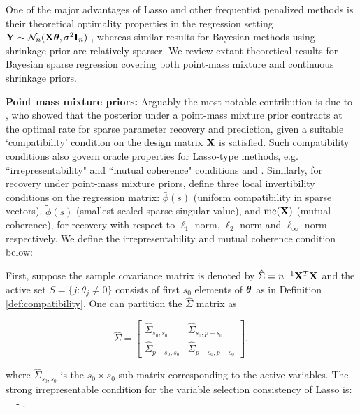 \documentclass[sts,preprint]{imsart}
\begin{document}
One of the major advantages of Lasso and other frequentist penalized methods is their theoretical optimality properties in the regression setting ${\bf Y} \sim {\cal N}_n({\bf X} \boldsymbol{\theta}, \sigma^2 {\bf I}_n)$ \citep[e.g.]{buhlmann2011statistics}, whereas similar results for Bayesian methods using shrinkage prior are relatively sparser. We review extant theoretical results for Bayesian sparse regression covering both point-mass mixture and continuous shrinkage priors. 

\vspace{0.1in}
\noindent \textbf{Point mass mixture priors:} Arguably the most notable contribution is due to \citet{castillo2015bayesian}, who showed that the posterior under a point-mass mixture prior contracts at the optimal rate for sparse parameter recovery and prediction, 
given a suitable `compatibility' condition on the design matrix ${\bf X}$ is satisfied. Such compatibility conditions also govern oracle properties for Lasso-type methods, e.g. ``irrepresentability" and ``mutual coherence" conditions \citep[\textit{vide} Ch. 6]{buhlmann2011statistics} and \citep{zhao2006model}. Similarly, for recovery under point-mass mixture priors, \citet{castillo2015bayesian} define three local invertibility conditions on the regression matrix: $\bar{\phi}(s)$ (uniform compatibility in sparse vectors), $\tilde{\phi}(s)$ (smallest scaled sparse singular value), and $\text{mc}({\bf X})$ (mutual coherence), for recovery with respect to $\ell_1$ norm, $\ell_2$ norm and $\ell_{\infty}$ norm respectively. We define the irrepresentability and mutual coherence condition below:

First, suppose the sample covariance matrix is denoted by $\hat{\Sigma} = n^{-1} {\bf X}^T {\bf X}$ and the active set $S = \{ j : \theta_j \ne 0 \}$ consists of first $s_0$ elements of $\boldsymbol{\theta}$ as in Definition \ref{def:compatibility}. One can partition the $\hat{\Sigma}$ matrix as 

\[
\hat{\Sigma} = \begin{bmatrix} 
	\hat{\Sigma}_{s_0, s_0} & \hat{\Sigma}_{s_0, p - s_0} \\
  \hat{\Sigma}_{p-s_0, s_0} & \hat{\Sigma}_{p-s_0, p - s_0}   
								\end{bmatrix},
\]

where $\hat{\Sigma}_{s_0, s_0}$ is the $s_0 \times s_0$ sub-matrix corresponding to the active variables. The strong irrepresentable condition for the variable selection consistency of Lasso is: 
\beq 
{}_{\infty}  - \eta \;  \eta. \label{eq:irrep}
\eeq
\end{document}
